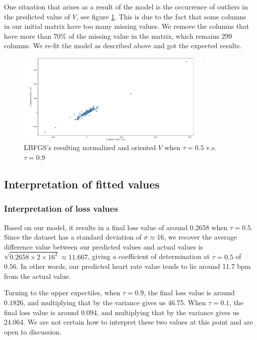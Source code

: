 \documentclass{article}
\begin{document}
One situation that arises as a result of the model is the occurrence of outliers in the predicted value of $V$, see figure \ref{outlier}.
This is due to the fact that some columns in our initial matrix have too many missing values. We remove the columns that have more than $70\%$ of the missing value in the matrix, which remains 299 columns. We re-fit the model as described above and got the expected results.

\begin{figure}[H]
\centering
\includegraphics[width=0.85\textwidth]{outlier.png} 
\caption{LBFGS's resulting normalized and oriented $V$ when $\tau = 0.5$ v.s. $\tau = 0.9$} 
\label{outlier} 
\end{figure}



\subsection{Interpretation of fitted values}

\subsubsection{Interpretation of loss values}

Based on our model, it results in a final loss value of around 0.2658 when $\tau = 0.5$. Since the dataset has a standard deviation of $\sigma \approx 16$, we recover the average difference value between our predicted values and actual values is $\sqrt{0.2658 \times 2 \times 16^2} \approx 11.667$, giving a coefficient of determination at $\tau=0.5$ of $0.56$. In other words, our predicted heart rate value tends to lie around 11.7 bpm from the actual value.

Turning to the upper expectiles, when $\tau = 0.9$, the final loss value is around $0.1826$, and multiplying that by the variance gives us 46.75. When $\tau = 0.1$, the final loss value is around $0.094$, and multiplying that by the variance gives us 24.064. We are not certain how to interpret these two values at this point and are open to discussion. 
\end{document}

